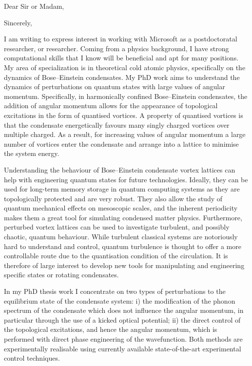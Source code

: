\documentclass[12pt,a4paper,unicode]{moderncv}
\begin{document}
    \date{\today} %
    \opening{Dear Sir or Madam,}
    \closing{Sincerely,}
    \makelettertitle
{
    I am writing to express interest in working with Microsoft as a postdoctoratal researcher, or researcher. Coming from a physics background, I have strong computational skills that I know will be beneficial and apt for many positions. My area of specialization is in theoretical cold atomic physics, specifically on the dynamics of Bose--Einstein condensates. My PhD work aims to understand the dynamics of perturbations on quantum states with large values of angular momentum. Specifically, in harmonically confined Bose--Einstein condensates, the addition of angular momentum allows for the appearance of topological excitations in the form of quantised vortices. A property of quantised vortices is that the condensate energetically favours many singly charged vortices over multiple charged. As a result, for increasing values of angular momentum a large number of vortices enter the condensate and arrange into a lattice to minimise the system energy.


    Understanding the behaviour of Bose--Einstein condensate vortex lattices can help with engineering quantum states for future technologies. Ideally, they can be used for long-term memory storage in quantum computing systems as they are topologically protected and are very robust. They also allow the study of quantum mechanical effects on mesoscopic scales, and the inherent periodicity makes them a great tool for simulating condensed matter physics. Furthermore, perturbed vortex lattices can be used to investigate turbulent, and possibly chaotic, quantum behaviour. While turbulent classical systems are notoriously hard to understand and control, quantum turbulence is thought to offer a more controllable route due to the quantisation condition of the circulation. It is therefore of large interest to develop new tools for manipulating and engineering specific states or rotating condensates.

    In my PhD thesis work I concentrate on two types of perturbations to the equilibrium state of the condensate system: i) the modification of the phonon spectrum of the condensate which does not influence the angular momentum, in particular through the use of a kicked optical potential; ii) the direct control of the topological excitations, and hence the angular momentum, which is performed with direct phase engineering of the wavefunction. Both methods are experimentally realisable using currently available state-of-the-art experimental control techniques.

}
\end{document}
